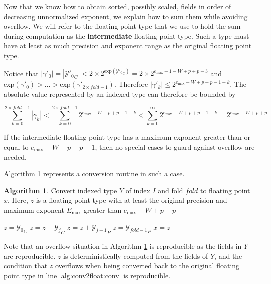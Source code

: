 \documentclass[12pt]{article}
\providecommand{\exp}{\ensuremath{\text{exp}}}
\providecommand{\max}{\ensuremath{\text{max}}}
\providecommand{\To}{\ensuremath{\text{ to }}}
\theoremstyle{definition}
\newtheorem{alg}{Algorithm}[section]
\numberwithin{equation}{section}
\begin{document}
    Now that we know how to obtain sorted, possibly scaled, fields in order of decreasing unnormalized exponent, we explain how to sum them while avoiding overflow. We will refer to the floating point type that we use to hold the sum during computation as the \textbf{intermediate} floating point type. Such a type must have at least as much precision and exponent range as the original floating point type.

    Notice that $|\gamma'_0| = |{\mathcal{Y}'_0}_C| < 2 \times 2^{\exp({\mathcal{Y}'_0}_C)} = 2 \times 2^{e_{\max} + 1 - W + p + p - 3}$ and $\exp(\gamma'_0) > ... > \exp(\gamma'_{2 \times fold - 1})$.  Therefore $|\gamma'_k| \leq 2^{e_{\max} - W + p + p - 1 - k}$. The absolute value represented by an indexed type can therefore be bounded by

    \begin{equation}
      \label{eq:maxindexedvalue}
      \sum\limits_{k = 0}^{2 \times fold - 1} |\gamma_k| < \sum\limits_{k = 0}^{2 \times fold - 1} 2^{e_{\max} - W + p + p - 1 - k} < \sum\limits_{k = 0}^{\infty} 2^{e_{\max} - W + p + p - 1 - k} = 2^{e_{\max} - W + p + p}
    \end{equation}

    If the intermediate floating point type has a maximum exponent greater than or equal to $e_{\max} - W + p + p - 1$, then no special cases to guard against overflow are needed.

    Algorithm \ref{alg:conv2float} represents a conversion routine in such a case.

    \begin{alg}
      Convert indexed type $Y$ of index $I$ and fold $fold$ to floating point $x$. Here, $z$ is a floating point type with at least the original precision and maximum exponent $E_{\max}$ greater than $e_{\max} - W + p + p$
      \begin{algorithmic}[1]
          \State $z = {\mathcal{Y}_0}_C$
          \For{$j = 1 \To fold - 1$}
            \State $z = z + {\mathcal{Y}_j}_C$
            \State $z = z + {\mathcal{Y}_{j - 1}}_P$
          \EndFor
          \State $z = {\mathcal{Y}_{fold - 1}}_P$
          \State $x = z$ \label{alg:conv2float:conv}
        \EndFunction
      \end{algorithmic}
      \label{alg:conv2float}
    \end{alg}

    Note that an overflow situation in Algorithm \ref{alg:conv2float} is reproducible as the fields in $Y$ are reproducible. $z$ is deterministically computed from the fields of $Y$, and the condition that $z$ overflows when being converted back to the original floating point type in line \ref{alg:conv2float:conv} is reproducible.
\end{document}
